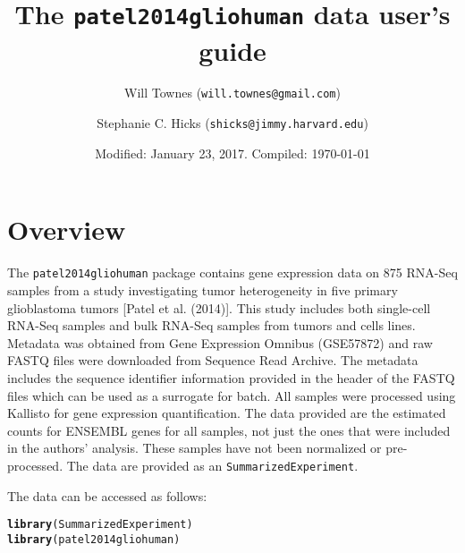 \documentclass{article}\usepackage[]{graphicx}\usepackage[usenames,dvipsnames]{color}
\title{The \texttt{patel2014gliohuman} data user's guide}
\author{Will Townes (\texttt{will.townes@gmail.com}) \and 
Stephanie C. Hicks (\texttt{shicks@jimmy.harvard.edu}) }
\date{Modified: January 23, 2017.  Compiled: \today}
\makeatletter
\newcommand{\hlstd}[1]{\textcolor[rgb]{0.345,0.345,0.345}{#1}}%
\newcommand{\hlkwd}[1]{\textcolor[rgb]{0.737,0.353,0.396}{\textbf{#1}}}%
\newenvironment{kframe}{%
 \def\at@end@of@kframe{}%
 \ifinner\ifhmode%
  \def\at@end@of@kframe{\end{minipage}}%
  \begin{minipage}{\columnwidth}%
 \fi\fi%
 \def\FrameCommand##1{\hskip\@totalleftmargin \hskip-\fboxsep
 \colorbox{shadecolor}{##1}\hskip-\fboxsep
     \hskip-\linewidth \hskip-\@totalleftmargin \hskip\columnwidth}%
 \MakeFramed {\advance\hsize-\width
   \@totalleftmargin\z@ \linewidth\hsize
   \@setminipage}}%
 {\par\unskip\endMakeFramed%
 \at@end@of@kframe}
\newenvironment{knitrout}{}{} %
\makeatother
\begin{document}
\maketitle

\section{Overview}

The \texttt{patel2014gliohuman} package contains gene expression data on 875 
RNA-Seq samples from a study investigating tumor heterogeneity 
in five primary glioblastoma tumors [Patel et al. (2014)]. 
This study includes both single-cell RNA-Seq samples and 
bulk RNA-Seq samples from tumors and cells lines. Metadata was obtained from 
Gene Expression Omnibus (GSE57872) and raw FASTQ files were 
downloaded from Sequence Read Archive. The metadata includes the sequence
identifier information provided in the header of the FASTQ files which can be used
as a surrogate for batch. All samples were processed using Kallisto 
for gene expression quantification. The data provided are the 
estimated counts for ENSEMBL genes for all samples, not just the 
ones that were included in the authors' analysis. 
These samples have not been normalized or pre-processed. 
The data are provided as an \texttt{SummarizedExperiment}. 

The data can be accessed as follows:
\begin{knitrout}
\color{fgcolor}\begin{kframe}
\begin{alltt}
\hlkwd{library}\hlstd{(SummarizedExperiment)}
\hlkwd{library}\hlstd{(patel2014gliohuman)}
\end{alltt}
\end{kframe}
\end{knitrout}
\end{document}
